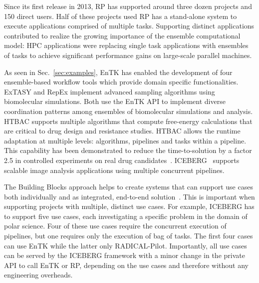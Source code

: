 \documentclass[preprint,12pt, a4paper]{elsarticle}
\begin{document}
Since its first release in 2013, RP has supported around three dozen projects
and 150 direct users. Half of these projects used RP has a stand-alone system
to execute applications comprised of multiple tasks. Supporting distinct
applications contributed to realize the growing importance of the
ensemble computational model: HPC applications were replacing single task
applications with ensembles of tasks to achieve significant performance gains
on large-scale parallel machines.

As seen in Sec.~\ref{sec:examples}, EnTK has enabled the development of four
ensemble-based workflow tools which provide domain specific functionalities.
ExTASY and RepEx implement advanced sampling algorithms using biomolecular
simulations. Both use the EnTK API to implement  diverse coordination patterns
among ensembles of biomolecular simulations and analysis. HTBAC supports
multiple algorithms that compute free-energy calculations that are critical to
drug design and resistance studies. HTBAC allows the runtime adaptation at
multiple levels: algorithms, pipelines and tasks within a pipeline. This
capability has been demonstrated to reduce the time-to-solution by a factor 2.5
in controlled experiments on real drug candidates~\citep{dakka2018concurrent}.
ICEBERG~\cite{paraskevakos2019workflow} supports scalable image analysis
applications using multiple concurrent pipelines.

The Building Blocks approach helps to create systems that can support use cases
both individually and as integrated, end-to-end
solution~\cite{turilli2019middleware}. This is important when supporting
projects with multiple, distinct use cases. For example, ICEBERG has to support
five use cases, each investigating a specific problem in the domain of polar
science. Four of these use cases require the concurrent execution of pipelines,
but one requires only the execution of bag of tasks. The first four cases can
use EnTK while the latter only RADICAL-Pilot. Importantly, all use cases can be
served by the ICEBERG framework with a minor change in the private API to call
EnTK or RP, depending on the use cases and therefore without any engineering
overheads.

\end{document}

